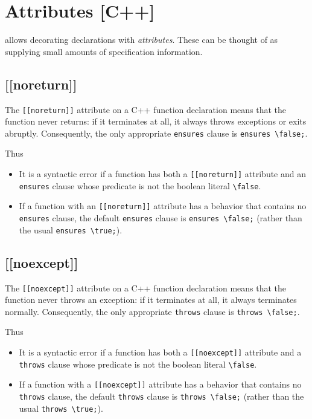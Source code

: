 \section{Attributes [C++]}
\label{sec:attributes}

\experimental

\lang allows decorating declarations with \textit{attributes}. 
These can be thought of as supplying small amounts of specification information.

\subsection{[[noreturn]]}
\label{sec:noreturn}

The \lstinline|[[noreturn]]| attribute on a C++ function declaration means
that the function never returns: if it terminates at all, it always throws 
exceptions or exits abruptly. Consequently, the only appropriate \lstinline|ensures| clause
is \lstinline|ensures \false;|.

Thus
\begin{itemize}
\item It is a syntactic error if a function has both a \lstinline|[[noreturn]]|
attribute and an \lstinline|ensures| clause whose predicate is not the 
boolean literal \lstinline|\false|.
\item If a function with an \lstinline|[[noreturn]]| attribute has a behavior
that contains no \lstinline|ensures| clause, the default \lstinline|ensures|
clause is \lstinline|ensures \false;| (rather than the usual \lstinline|ensures \true;|).
\end{itemize}

\subsection{[[noexcept]]}
\label{sec:nexcept}


The \lstinline|[[noexcept]]| attribute on a C++ function declaration means
that the function never throws an exception: if it terminates at all, it always terminates normally. Consequently, the only appropriate \lstinline|throws| clause
is \lstinline|throws \false;|.

Thus
\begin{itemize}
	\item It is a syntactic error if a function has both a \lstinline|[[noexcept]]|
	attribute and a \lstinline|throws| clause whose predicate is not the 
	boolean literal \lstinline|\false|.
	\item If a function with a \lstinline|[[noexcept]]| attribute has a behavior
	that contains no \lstinline|throws| clause, the default \lstinline|throws|
	clause is \lstinline|throws \false;| (rather than the usual \lstinline|throws \true;|).
\end{itemize}

